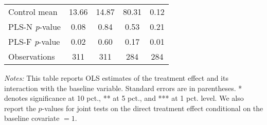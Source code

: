 \begin{table}[ht]
{\begin{threeparttable}
\begin{tabular}{l*{4}{c}}
Control mean    &    13.66         &    14.87         &    80.31         &     0.12         \\
PLS-N \emph{p}-value&     0.08         &     0.84         &     0.53         &     0.21         \\
PLS-F \emph{p}-value&     0.02         &     0.60         &     0.17         &     0.01         \\
Observations    &      311         &      311         &      284         &      284         \\
\bottomrule \end{tabular} \begin{tablenotes}[flushleft] \footnotesize \item \emph{Notes:} This table reports OLS estimates of the treatment effect and its interaction with the baseline variable. Standard errors are in parentheses. * denotes significance at 10 pct., ** at 5 pct., and *** at 1 pct. level. We also report the \(p\)-values for joint tests on the direct treatment effect conditional on the baseline covariate $= 1$. \end{tablenotes} \end{threeparttable} } \end{table}

